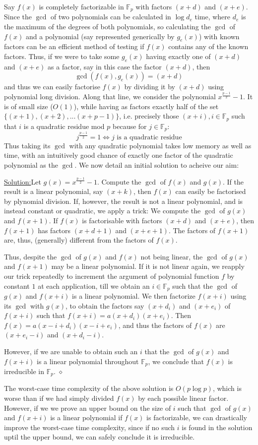 \documentclass{report}
\newenvironment{aimsol}[1]{\vspace{2.5mm}\par\noindent\underline{Solution:}\space#1}{\hfill $\diamond$ \vspace{2.5mm} \par}
\begin{document}
Say $f(x)$ is completely factorizable in $\mathbb{F}_p$ with factors $(x+d)$ and $(x+e)$. Since the $\gcd$ of two polynomials can be calculated in $\log d_e$ time, where $d_e$ is the maximum of the degrees of both polynomials, so calculating the $\gcd$ of $f(x)$ and a polynomial (say represented generically by $g_e(x)$) with known factors can be an efficient method of testing if $f(x)$ contains any of the known factors. Thus, if we were to take some $g_e(x)$ having exactly one of $(x+d)$ and $(x+e)$ as a factor, say in this case the factor $(x+d)$, then
\[\gcd(f(x),g_e(x))=(x+d)\]
and thus we can easily factorise $f(x)$ by dividing it by $(x+d)$ using polynomial long division. Along that line, we consider the polynomial $x^{\frac{p-1}{2}}-1$. It is of small size ($O(1)$), while having as factors exactly half of the set $\{(x+1),(x+2),...(x+p-1)\}$, i.e. precisely those $(x+i), i\in \mathbb{F}_p$ such that $i$ is a quadratic residue mod $p$ because for $j\in\mathbb{F}_p$:
$$j^{\frac{p-1}{2}}=1 \Leftrightarrow j\text{ is a quadratic residue}$$
Thus taking its $\gcd$ with any quadratic polynomial takes low memory as well as time, with an intuitively good chance of exactly one factor of the quadratic polynomial as the $\gcd$. We now detail an initial solution to acheive our aim:
\begin{aimsol}
Let $g(x)=x^{\frac{p-1}{2}}-1$. Compute the $\gcd$ of $f(x)$ and $g(x)$. If the result is a linear polynomial, say $(x+k)$, then $f(x)$ can easily be factorised by plynomial division. If, however, the result is not a linear polynomial, and is instead constant or quadratic, we apply a trick: We compute the $\gcd$ of $g(x)$ and $f(x+1)$. If $f(x)$ is factorisable with factors $(x+d)$ and $(x+e)$, then $f(x+1)$ has factors $(x+d+1)$ and $(x+e+1)$. The factors of $f(x+1)$ are, thus, (generally) different from the factors of $f(x)$.

Thus, despite the $\gcd$ of $g(x)$ and $f(x)$ not being linear, the $\gcd$ of $g(x)$ and $f(x+1)$ may be a linear polynomial. If it is not linear again, we reapply our trick repeatedly to increment the argument of polynomial function $f$ by constant $1$ at each application, till we obtain an $i\in\mathbb{F}_p$ such that the $\gcd$ of $g(x)$ and $f(x+i)$ is a linear polynomial. We then factorize $f(x+i)$ using its $\gcd$ with $g(x)$, to obtain the factors say $(x+d_i)$ and $(x+e_i)$ of $f(x+i)$ such that $f(x+i)=a(x+d_i)(x+e_i)$. Then $f(x)=a(x-i+d_i)(x-i+e_i)$, and thus the factors of $f(x)$ are $(x+e_i-i)$ and $(x+d_i-i)$.

However, if we are unable to obtain such an $i$ that the $\gcd$ of $g(x)$ and $f(x+i)$ is a linear polynomial throughout $\mathbb{F}_p$, we conclude that $f(x)$ is irreducible in $\mathbb{F}_p$.
\end{aimsol}
%
The worst-case time complexity of the above solution is $O(p\log p)$, which is worse than if we had simply divided $f(x)$ by each possible linear factor. However, if we we prove an upper bound on the size of $i$ such that $\gcd$ of $g(x)$ and $f(x+i)$ is a linear polynomial if $f(x)$ is factorizable, we can drastically improve the worst-case time complexity, since if no such $i$ is found in the solution uptil the upper bound, we can safely conclude it is irreducible.
\end{document}

